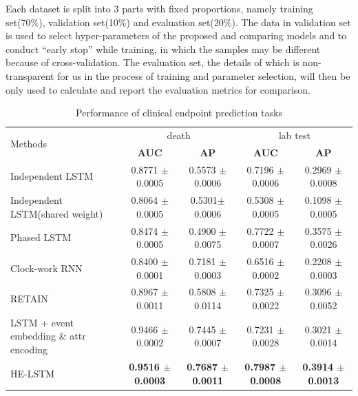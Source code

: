 \documentclass[letterpaper]{article} %
\begin{document}
Each dataset is split into 3 parts with fixed proportions, namely training set(70\%), validation set(10\%) and evaluation set(20\%). The data in validation set is used to select hyper-parameters of the proposed and comparing models and to conduct ``early stop'' while training, in which the samples may be different because of cross-validation.
The evaluation set, the details of which is non-transparent for us in the process of training and parameter selection, will then be only used to calculate and report the evaluation metrics for comparison.

\begin{table}[!t]
\renewcommand\arraystretch{0.9}
\centering

\begin{tabular}{|l||c|c||c|c|}
\hline
\multirow{2}{*}{Methods} & \multicolumn{2}{c||}{death} & \multicolumn{2}{c|}{lab test}  \\
\cline{2-5}            
& \textbf{AUC } 
&  \textbf{AP}
&\textbf{AUC }  
& \textbf{AP }  \\\hline


Independent LSTM      & 0.8771  $\pm$ 0.0005      & 0.5573 $\pm$ 0.0006 & 0.7196 $\pm$ 0.0006& 0.2969 $\pm$ 0.0008 \\
Independent LSTM(shared weight)   & 0.8064  $\pm$ 0.0005       & 0.5301$\pm$ 0.0006 & 0.5308 $\pm$ 0.0005 & 0.1098  $\pm$ 0.0005 \\
\hline
Phased LSTM & 0.8474 $\pm$ 0.0005  & 0.4900 $\pm$ 0.0075& 0.7722 $\pm$ 0.0007& 0.3575 $\pm$ 0.0026 \\
Clock-work RNN       & 0.8400 $\pm$ 0.0001     &  0.7181 $\pm$ 0.0003 & 0.6516 $\pm$ 0.0002 & 0.2208  $\pm$ 0.0003\\


\hline

RETAIN & 0.8967 $\pm$ 0.0011 & 0.5808 $\pm$ 0.0114 & 0.7325 $\pm$ 0.0022& 0.3096 $\pm$ 0.0052\\
LSTM + event embedding \& attr encoding& 0.9466 $\pm$ 0.0002 & 0.7445 $\pm$ 0.0007 & 0.7231 $\pm$ 0.0028& 0.3021 $\pm$ 0.0014\\
\hline

HE-LSTM & \textbf{0.9516  $\pm$ 0.0003}& \textbf{0.7687 $\pm$ 0.0011} & \textbf{0.7987 $\pm$ 0.0008} & \textbf{0.3914 $\pm$ 0.0013} \\


\hline
\end{tabular}

\caption{Performance of clinical endpoint prediction tasks}
\label{tab:result}

\end{table}
\end{document}
